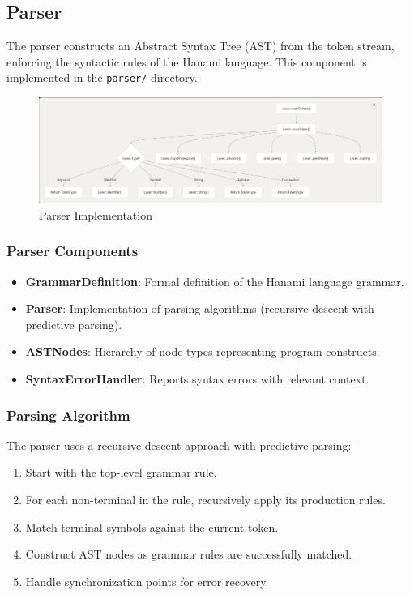 \documentclass[conference]{IEEEtran}
\begin{document}
\subsection{Parser}
The parser constructs an Abstract Syntax Tree (AST) from the token stream, enforcing the syntactic rules of the Hanami language. This component is implemented in the \texttt{parser/} directory.
\begin{figure}[H] %
    \centering
    \includegraphics[width=1\linewidth]{lexer_imp} %
    \caption{Parser Implementation}
    \label{fig:parser_imp} %
\end{figure}
\subsubsection{Parser Components}
\begin{itemize}
    \item \textbf{GrammarDefinition}: Formal definition of the Hanami language grammar.
    \item \textbf{Parser}: Implementation of parsing algorithms (recursive descent with predictive parsing).
    \item \textbf{ASTNodes}: Hierarchy of node types representing program constructs.
    \item \textbf{SyntaxErrorHandler}: Reports syntax errors with relevant context.
\end{itemize}

\subsubsection{Parsing Algorithm}
The parser uses a recursive descent approach with predictive parsing:
\begin{enumerate}
    \item Start with the top-level grammar rule.
    \item For each non-terminal in the rule, recursively apply its production rules.
    \item Match terminal symbols against the current token.
    \item Construct AST nodes as grammar rules are successfully matched.
    \item Handle synchronization points for error recovery.
\end{enumerate}
\end{document}
